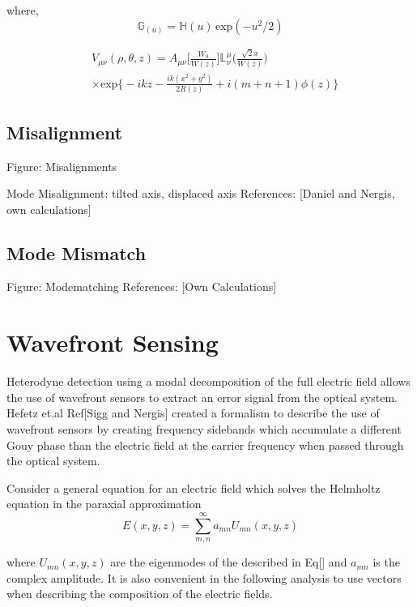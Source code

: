 \documentclass[oneside]{book}
\begin{document}
		where,
		\begin{equation}
		\mathbb{G}_(u) = \mathbb{H}(u) \, \text{exp}(-u^2/2)
		\end{equation}
		
		\begin{equation}	
		\begin{aligned}
		&V_{\mu\nu}(\rho,\theta,z) = A_{\mu\nu}\bigg[ \frac{W_0}{W(z)} \bigg] \mathbb{L}^{\mu}_{\nu} \Bigg( \frac{\sqrt{2}x}{W(z)}  \Bigg) \\
		&\times \text{exp} \bigg\{-ikz-\frac{ik(x^2+y^2)}{2R(z)} + i(m+n+1)\phi(z) \bigg\}
		\end{aligned}
		\end{equation}
		

		\subsection{Misalignment}\label{Misalignment}
			
		Figure: Misalignments
		
			Mode Misalignment: tilted axis, displaced axis
			References: [Daniel and Nergis, own calculations]
			
		\subsection{Mode Mismatch}\label{Mode Match}
		Figure: Modematching
			References: [Own Calculations]
				
		
		\section{Wavefront Sensing}
		Heterodyne detection using a modal decomposition of the full electric field allows the use of wavefront sensors to extract an error signal from the optical system.  Hefetz et.al Ref[Sigg and Nergis] created a formalism to describe the use of wavefront sensors by creating frequency sidebands which accumulate a different Gouy phase than the electric field at the carrier frequency when passed through the optical system.  
		
		Consider a general equation for an electric field which solves the Helmholtz equation in the paraxial approximation
		\begin{equation}
		E(x,y,z) = \sum\limits_{m,n}^{\infty} a_{mn} U_{mn}(x,y,z)
		\end{equation}
		
		where $ U_{mn}(x,y,z)$ are the eigenmodes of the described in Eq[] and $a_{mn}$ is the complex amplitude.  It is also convenient in the following analysis to use vectors when describing the composition of the electric fields.
		
\end{document}
